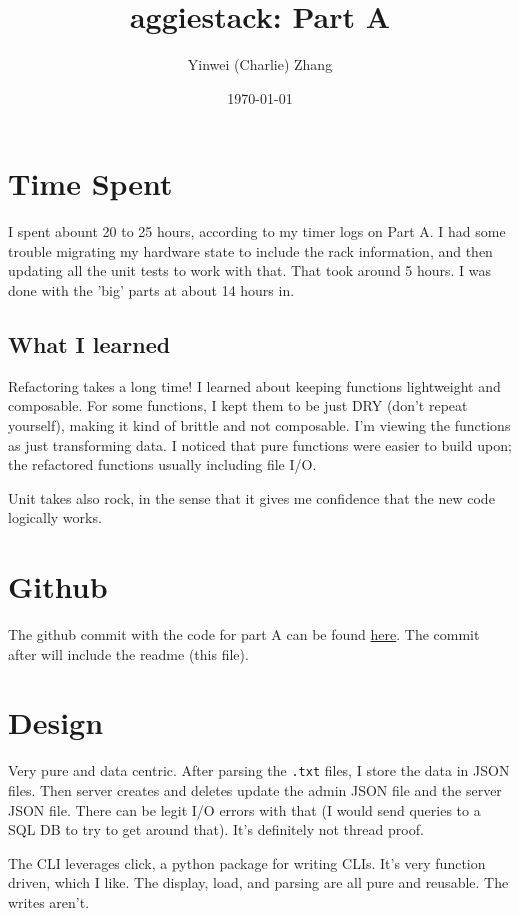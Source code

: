\documentclass[11pt]{article}
\author{Yinwei (Charlie) Zhang}
\date{\today}
\title{aggiestack: Part A}
\begin{document}
\maketitle
\tableofcontents


\section{Time Spent}
\label{sec:orgb58fd12}
I spent abount 20 to 25 hours, according to my timer logs on Part A.  I had some trouble migrating my hardware state to include the rack information, and then updating all the unit tests to work with that.  That took around 5 hours.  I was done with the 'big' parts at about 14 hours in.

\subsection{What I learned}
\label{sec:org82cff0c}
Refactoring takes a long time!  I learned about keeping functions lightweight and composable.  For some functions, I kept them to be just DRY (don't repeat yourself), making it kind of brittle and not composable.  I'm viewing the functions as just transforming data.  I noticed that pure functions were easier to build upon; the refactored functions usually including file I/O.

Unit takes also rock, in the sense that it gives me confidence that the new code logically works.

\section{Github}
\label{sec:org83023cd}
The github commit with the code for part A can be found \href{https://github.tamu.edu/cyinwei/489-17-c/commit/19489697362ee15267be2bd3aa724673eb7a7a7e}{here}.  The commit after will include the readme (this file).
\section{Design}
\label{sec:org45749ab}
Very pure and data centric.  After parsing the \texttt{.txt} files, I store the data in JSON files.  Then server creates and deletes update the admin JSON file and the server JSON file.  There can be legit I/O errors with that (I would send queries to a SQL DB to try to get around that).  It's definitely not thread proof.

The CLI leverages click, a python package for writing CLIs.  It's very function driven, which I like.  The display, load, and parsing are all pure and reusable.  The writes aren't.
\end{document}
